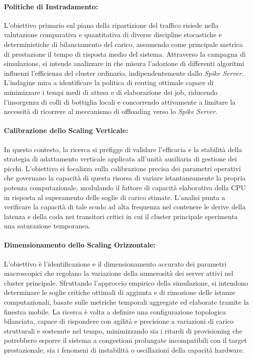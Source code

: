 ﻿\documentclass[a4paper,12pt]{article}
\begin{document}
\paragraph{Politiche di Instradamento:}
L'obiettivo primario sul piano della ripartizione del traffico risiede nella valutazione comparativa e quantitativa di diverse discipline stocastiche e deterministiche di bilanciamento del carico, assumendo come principale metrica di prestazione il tempo di risposta medio del sistema. Attraverso la campagna di simulazione, si intende analizzare in che misura l'adozione di differenti algoritmi influenzi l'efficienza del cluster ordinario, indipendentemente dallo \textit{Spike Server}. L'indagine mira a identificare la politica di routing ottimale capace di minimizzare i tempi medi di attesa e di elaborazione dei job, riducendo l'insorgenza di colli di bottiglia locali e concorrendo attivamente a limitare la necessità di ricorrere al meccanismo di offloading verso lo \textit{Spike Server}.

\paragraph{Calibrazione dello Scaling Verticale:}
In questo contesto, la ricerca si prefigge di validare l'efficacia e la stabilità della strategia di adattamento verticale applicata all'unità ausiliaria di gestione dei picchi. L'obiettivo si focalizza sulla calibrazione precisa dei parametri operativi che governano la capacità di questa risorsa di variare istantaneamente la propria potenza computazionale, modulando il fattore di capacità elaborativa della CPU in risposta al superamento delle soglie di carico stimate. L'analisi punta a verificare la capacità di tale scudo ad alta frequenza nel contenere le derive della latenza e della coda nei transitori critici in cui il cluster principale sperimenta una saturazione temporanea.

\paragraph{Dimensionamento dello Scaling Orizzontale:}
L'obiettivo è l'identificazione e il dimensionamento accurato dei parametri macroscopici che regolano la variazione della numerosità dei server attivi nel cluster principale. Sfruttando l'approccio empirico della simulazione, si intendono determinare le soglie critiche ottimali di aggiunta e di rimozione delle istanze computazionali, basate sulle metriche temporali aggregate ed elaborate tramite la finestra mobile. La ricerca è volta a definire una configurazione topologica bilanciata, capace di rispondere con agilità e precisione a variazioni di carico strutturali e sostenute nel tempo, minimizzando sia i ritardi di provisioning che potrebbero esporre il sistema a congestioni prolungate incompatibili con il target prestazionale, sia i fenomeni di instabilità o oscillazioni della capacità hardware.
\end{document}
